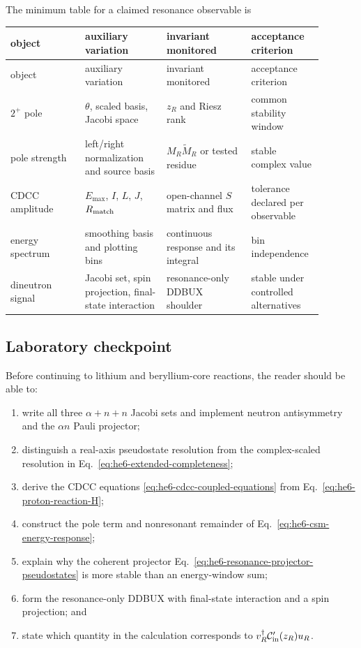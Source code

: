 The minimum table for a claimed resonance observable is
\begin{longtable}{@{}p{0.22\linewidth}p{0.24\linewidth}p{0.25\linewidth}p{0.18\linewidth}@{}}
\toprule
object & auxiliary variation & invariant monitored & acceptance criterion\\
\midrule
\endfirsthead
\toprule
object & auxiliary variation & invariant monitored & acceptance criterion\\
\midrule
\endhead
$2^+$ pole & $\theta$, scaled basis, Jacobi space &
$z_R$ and Riesz rank & common stability window\\
\addlinespace
pole strength & left/right normalization and source basis &
$M_R\widetilde M_R$ or tested residue & stable complex value\\
\addlinespace
CDCC amplitude & $E_{\max}$, $I$, $L$, $J$, $R_{\mathrm{match}}$ &
open-channel $S$ matrix and flux & tolerance declared per observable\\
\addlinespace
energy spectrum & smoothing basis and plotting bins &
continuous response and its integral & bin independence\\
\addlinespace
dineutron signal & Jacobi set, spin projection, final-state interaction &
resonance-only DDBUX shoulder & stable under controlled alternatives\\
\bottomrule
\end{longtable}

\subsection*{Laboratory checkpoint}

Before continuing to lithium and beryllium-core reactions, the reader should
be able to:
\begin{enumerate}[label=\arabic*.]
  \item write all three $\alpha+n+n$ Jacobi sets and implement neutron
  antisymmetry and the $\alpha n$ Pauli projector;
  \item distinguish a real-axis pseudostate resolution from the
  complex-scaled resolution in Eq.~\eqref{eq:he6-extended-completeness};
  \item derive the CDCC equations
  \eqref{eq:he6-cdcc-coupled-equations} from
  Eq.~\eqref{eq:he6-proton-reaction-H};
  \item construct the pole term and nonresonant remainder of
  Eq.~\eqref{eq:he6-csm-energy-response};
  \item explain why the coherent projector
  Eq.~\eqref{eq:he6-resonance-projector-pseudostates} is more stable than an
  energy-window sum;
  \item form the resonance-only DDBUX with final-state interaction and a
  spin projection; and
  \item state which quantity in the calculation corresponds to
  $v_R^\dagger\mathcal{C}_{\mathrm{in}}'(z_R)u_R$.
\end{enumerate}
